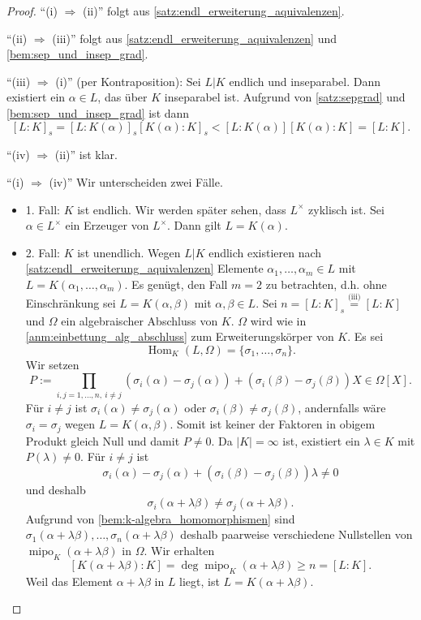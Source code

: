 \documentclass[a4paper, twoside, 11pt, ngerman]{report}
\DeclareMathOperator{\Hom}{Hom}
\DeclareMathOperator{\mipo}{mipo}
\theoremstyle{definistyle}
\theoremstyle{remark}
\begin{document}
\begin{proof}
"`(i) $\Rightarrow$ (ii)"' folgt aus \ref{satz:endl_erweiterung_aquivalenzen}.

"`(ii) $\Rightarrow$ (iii)"' folgt aus \ref{satz:endl_erweiterung_aquivalenzen} und \ref{bem:sep_und_insep_grad}.

"`(iii) $\Rightarrow$ (i)"' (per Kontraposition): Sei $L|K$ endlich und inseparabel. Dann existiert ein $\alpha \in L$, das über $K$ inseparabel ist. Aufgrund von \ref{satz:sepgrad} und \ref{bem:sep_und_insep_grad} ist dann
\[
[L : K]_s = [L:K(\alpha)]_s[K(\alpha):K]_s<[L:K(\alpha)][K(\alpha):K]=[L:K].
\]

"`(iv) $\Rightarrow$ (ii)"' ist klar.

"`(i) $\Rightarrow$ (iv)"' Wir unterscheiden zwei Fälle.
\begin{itemize}
\item{1. Fall: $K$ ist endlich.} Wir werden später sehen, dass $L^\times$ zyklisch ist. Sei $\alpha \in L^\times$ ein Erzeuger von $L^\times$. Dann gilt $L = K(\alpha)$.

\item{2. Fall: $K$ ist unendlich.} Wegen $L|K$ endlich existieren nach \ref{satz:endl_erweiterung_aquivalenzen} Elemente $\alpha_1, \dots, \alpha_m \in L$ mit $L = K(\alpha_1, \dots, \alpha_m)$. Es genügt, den Fall $m = 2$ zu betrachten, d.h.
ohne Einschränkung sei $L = K(\alpha, \beta)$ mit $\alpha, \beta \in L$. Sei $n = [L : K]_s \overset{\text{(iii)}}{=} [L : K]$ und $\Omega$ ein algebraischer Abschluss von $K$. $\Omega$ wird wie in \ref{anm:einbettung_alg_abschluss} zum 
Erweiterungskörper von $K$. Es sei
\[
  \Hom_K(L, \Omega) = \{\sigma_1, \dots, \sigma_n\}.
\]
Wir setzen
\[
P := \prod_{i,j=1,\ldots,n,\ i\neq j} \left(\sigma_i(\alpha) - \sigma_j(\alpha)\right) + \left(\sigma_i(\beta) - \sigma_j(\beta)\right) X \in \Omega[X].
\]
Für $i \neq j$ ist $\sigma_i(\alpha) \neq \sigma_j(\alpha)$ oder $\sigma_i(\beta) \neq \sigma_j(\beta)$, andernfalls wäre $\sigma_i = \sigma_j$ wegen $L = K(\alpha, \beta)$. Somit ist keiner der Faktoren in obigem Produkt gleich Null
und damit $P\neq0$. Da $|K| = \infty$ ist, existiert ein $\lambda \in K$ mit $P(\lambda) \neq 0$. Für $i \neq j$ ist
\[
\sigma_i(\alpha)-\sigma_j(\alpha)+\left(\sigma_i(\beta)-\sigma_j(\beta)\right)\lambda\neq 0
\]
und deshalb
\[
\sigma_i(\alpha + \lambda \beta) \neq \sigma_j(\alpha + \lambda \beta).
\]
Aufgrund von \ref{bem:k-algebra_homomorphismen} sind $\sigma_1(\alpha + \lambda \beta), \dots, \sigma_n(\alpha + \lambda \beta)$ deshalb paarweise verschiedene Nullstellen von $\mipo_K(\alpha + \lambda \beta)$ in $\Omega$. Wir erhalten
\[
[K(\alpha + \lambda \beta) : K]=\deg \mipo_K(\alpha + \lambda \beta)\geq n=[L:K]. 
\]
Weil das Element $\alpha+\lambda\beta$ in $L$ liegt, ist $L = K(\alpha + \lambda \beta)$.
\end{itemize}
\end{proof}
\end{document}
